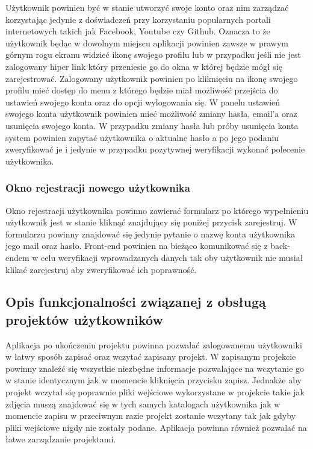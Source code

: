 \documentclass{article}
\begin{document}
Użytkownik powinien być w stanie utworzyć swoje konto oraz nim zarządzać korzystając jedynie z doświadczeń przy korzystaniu popularnych portali internetowych takich jak Facebook, Youtube czy Github. Oznacza to że użytkownik będąc w dowolnym miejscu aplikacji powinien zawsze w prawym górnym rogu ekranu widzieć ikonę swojego profilu lub w przypadku jeśli nie jest zalogowany hiper link który przeniesie go do okna w której będzie mógł się zarejestrować. Zalogowany użytkownik powinien po kliknięciu na ikonę swojego profilu mieć dostęp do menu z którego będzie miał możliwość przejścia do ustawień swojego konta oraz do opcji wylogowania się. W panelu ustawień swojego konta użytkownik powinien mieć możliwość zmiany hasła, email'a oraz usunięcia swojego konta. W przypadku zmiany hasła lub próby usunięcia konta system powinien zapytać użytkownika o aktualne hasło a po jego podaniu zweryfikować je i jedynie w przypadku pozytywnej weryfikacji wykonać polecenie użytkownika.

\subsubsection{Okno rejestracji nowego użytkownika}

Okno rejestracji użytkownika powinno zawierać formularz po którego wypełnieniu użytkownik jest w stanie kliknąć znajdujący się poniżej przycisk zarejestruj. W formularzu powinny znajdować się jedynie pytanie o nazwę konta użytkownika jego mail oraz hasło. Front-end powinien na bieżąco komunikować się z back-endem w celu weryfikacji wprowadzanych danych tak oby użytkownik nie musiał klikać zarejestruj aby zweryfikować ich poprawność.

\subsection{Opis funkcjonalności związanej z obsługą projektów użytkowników}

Aplikacja po ukończeniu projektu powinna pozwalać zalogowanemu użytkowniki w łatwy sposób zapisać oraz wczytać zapisany projekt. W zapisanym projekcie powinny znaleźć się wszystkie niezbędne informacje pozwalające na wczytanie go w stanie identycznym jak w momencie kliknięcia przycisku zapisz. Jednakże aby projekt wczytał się poprawnie pliki wejściowe wykorzystane w projekcie takie jak zdjęcia muszą znajdować się w tych samych katalogach użytkownika jak w momencie zapisu w przeciwnym razie projekt zostanie wczytany tak jak gdyby pliki wejściowe nigdy nie zostały podane. Aplikacja powinna również pozwalać na łatwe zarządzanie projektami.
\end{document}
